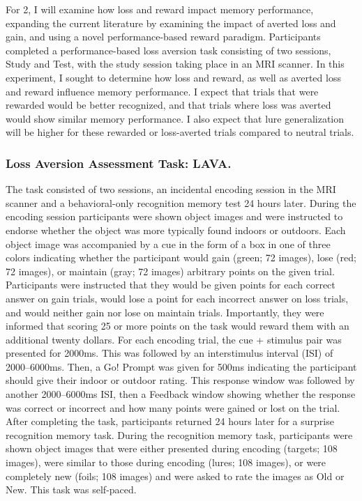\documentclass[11pt]{article}
\begin{document}
For 2, I will examine how loss and reward impact memory performance, expanding
the current literature by examining the impact of averted loss and gain, and using a
novel performance-based reward paradigm. Participants completed a performance-based loss
aversion task consisting of two sessions, Study and Test, with the study session taking
place in an MRI scanner. In this experiment, I sought to determine how loss and reward,
as well as averted loss and reward influence memory performance. I expect that trials
that were rewarded would be better recognized, and that trials where loss was averted
would show similar memory performance. I also expect that lure generalization will be
higher for these rewarded or loss-averted trials compared to neutral trials.
\subsubsection*{Loss Aversion Assessment Task: LAVA.}
The task consisted of two sessions, an incidental encoding session in the MRI scanner
and a behavioral-only recognition memory test 24 hours later. During the encoding
session participants were shown object images and were instructed to endorse whether the
object was more typically found indoors or outdoors. Each object image was accompanied
by a cue in the form of a box in one of three colors indicating whether the participant
would gain (green; 72 images), lose (red; 72 images), or maintain (gray; 72 images)
arbitrary points on the given trial. Participants were instructed that they would be
given points for each correct answer on gain trials, would lose a point for each
incorrect answer on loss trials, and would neither gain nor lose on maintain trials.
Importantly, they were informed that scoring 25 or more points on the task would reward
them with an additional twenty dollars. For each encoding trial, the cue + stimulus pair
was presented for 2000ms. This was followed by an interstimulus interval (ISI) of
2000--6000ms. Then, a Go! Prompt was given for 500ms indicating the participant should give their
indoor or outdoor rating. This response window was followed by another 2000--6000ms ISI,
then a Feedback window showing whether the response was correct or incorrect and how
many points were gained or lost on the trial. After completing the task, participants
returned 24 hours later for a surprise recognition memory task. During the recognition
memory task, participants were shown object images that were either presented during
encoding (targets; 108 images), were similar to those during encoding (lures; 108 images), or were
completely new (foils; 108 images) and were asked to rate the images as Old or New.
This task was self-paced.
\end{document}
